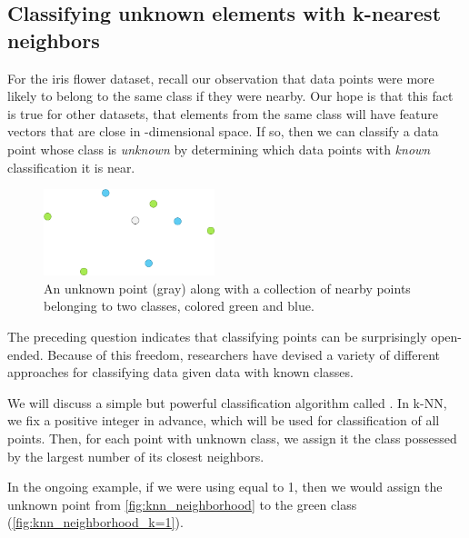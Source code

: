 \FloatBarrier
{}
\subsection{Classifying unknown elements with k-nearest neighbors}

For the iris flower dataset, recall our observation that data points were more likely to belong to the same class if they were nearby. Our hope is that this fact is true for other datasets, that elements from the same class will have feature vectors that are close in -dimensional space. If so, then we can classify a data point whose class is \textit{unknown} by determining which data points with \textit{known} classification it is near.\\

\begin{qbox}\end{qbox}

\begin{figure}[h]
\centering
\mySfFamily
\includegraphics[width = 0.444\textwidth]{../images/knn_neighborhood.png}
\caption{An unknown point (gray) along with a collection of nearby points belonging to two classes, colored green and blue.}
\label{fig:knn_neighborhood}
\end{figure}

The preceding question indicates that classifying points can be surprisingly open-ended. Because of this freedom, researchers have devised a variety of different approaches for classifying data given data with known classes.

We will discuss a simple but powerful classification algorithm called . In k-NN, we fix a positive integer  in advance, which will be used for classification of all points. Then, for each point with unknown class, we assign it the class possessed by the largest number of its  closest neighbors.

In the ongoing example, if we were using  equal to 1, then we would assign the unknown point from \autoref{fig:knn_neighborhood} to the green class (\autoref{fig:knn_neighborhood_k=1}).\\

